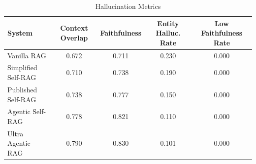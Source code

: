 
\begin{table}[h]
\centering
\caption{Hallucination Metrics}
\label{tab:hallucination}
\begin{tabular}{lcccc}
\toprule
System & Context Overlap & Faithfulness & Entity Halluc. Rate & Low Faithfulness Rate \\
\midrule
Vanilla RAG & 0.672 & 0.711 & 0.230 & 0.000 \\
Simplified Self-RAG & 0.710 & 0.738 & 0.190 & 0.000 \\
Published Self-RAG & 0.738 & 0.777 & 0.150 & 0.000 \\
Agentic Self-RAG & 0.778 & 0.821 & 0.110 & 0.000 \\
Ultra Agentic RAG & 0.790 & 0.830 & 0.101 & 0.000 \\
\bottomrule
\end{tabular}
\end{table}
